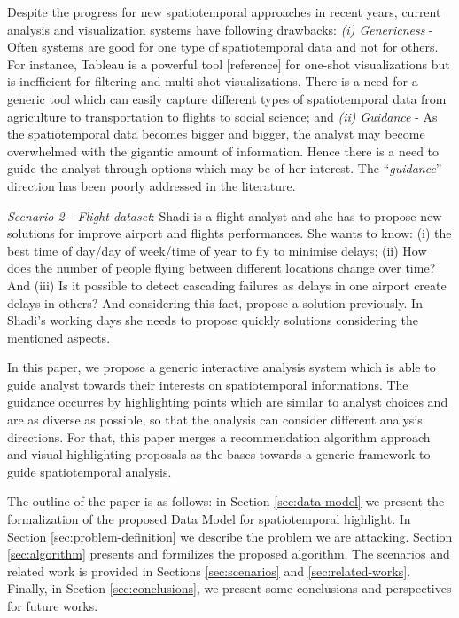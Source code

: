 Despite the progress for new spatiotemporal approaches in recent years, current
analysis and visualization systems have following drawbacks: \textit{(i)
Genericness} - Often systems are good for one type of spatiotemporal data and
not for others. For instance, Tableau is a powerful tool [reference] for
one-shot visualizations but is inefficient for filtering and multi-shot
visualizations. There is a need for a generic tool which can easily capture
different types of spatiotemporal data from agriculture to transportation to
flights to social science; and \textit{(ii) Guidance} - As the spatiotemporal
data becomes bigger and bigger, the analyst may become overwhelmed with the
gigantic amount of information. Hence there is a need to guide the analyst
through options which may be of her interest. The ``\textit{guidance}''
direction has been poorly addressed in the literature.

\textit{Scenario 2 - Flight dataset}: Shadi is a flight analyst and she has to
propose new solutions for improve airport and flights performances. She wants to know:
(i) the best time of day/day of week/time of year to fly to minimise delays;
(ii) How does the number of people flying between different locations change
over time? And (iii) Is it possible to detect cascading failures as delays in
one airport create delays in others? And considering this fact, propose a
solution previously. In Shadi's working days she needs to propose quickly
solutions considering the mentioned aspects. 

In this paper, we propose a generic interactive analysis system which is able to
guide analyst towards their interests on spatiotemporal informations. The
guidance occurres by highlighting points which are similar to analyst choices and are as diverse as possible, so
that the analysis can consider different analysis directions. For that, this
paper merges a recommendation algorithm approach \cite{Omidvar-Tehrani:2015} and
visual highlighting proposals \cite{Lohmann:2012,Robinson2011,Liang2010} as the
bases towards a generic framework to guide spatiotemporal analysis.

The outline of the paper is as follows: in Section \ref{sec:data-model} we
present the formalization of the proposed Data Model for spatiotemporal
highlight. In Section \ref{sec:problem-definition} we describe the problem we
are attacking. Section \ref{sec:algorithm} presents and formilizes the proposed
algorithm. The scenarios and related work is provided in Sections \ref{sec:scenarios} and
\ref{sec:related-works}. Finally, in Section \ref{sec:conclusions}, we present 
some conclusions and perspectives for future works.